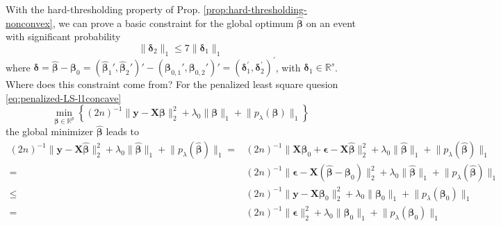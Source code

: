 \documentclass[twoside]{article}
\begin{document}
With the hard-thresholding property of Prop. \ref{prop:hard-thresholding-nonconvex}, we can prove a basic constraint for the global optimum $\hat{\boldsymbol{\beta}}$ on an event with significant probability \citep{fan2014asymptotic}
\begin{equation}\label{eq:basic_constrant}
    \lVert \boldsymbol{\delta}_2 \rVert _1 \leq 7 \lVert \boldsymbol{\delta}_1 \rVert _1
\end{equation}
where $\boldsymbol{\delta} = \hat{\boldsymbol{\beta}}-\boldsymbol{\beta}_0 = \left( \hat{\boldsymbol{\beta}}_1',\hat{\boldsymbol{\beta}}_2' \right)' - \left( {\boldsymbol{\beta}}_{0,1}',{\boldsymbol{\beta}}_{0,2}' \right)' = \left( \boldsymbol{\delta}^{\prime}_1,\boldsymbol{\delta}^{\prime}_2 \right)^{\prime}$, with $\boldsymbol{\delta}_1\in\mathbb{R}^s$. Where does this constraint come from? For the penalized least square quesion \ref{eq:penalized-LS-l1concave}
$$
\min_{\boldsymbol{\beta}\in\mathbb{R}^p}\left\{ (2n)^{-1}\lVert \mathbf{y}-\mathbf{X}\boldsymbol{\beta} \rVert ^2_2 + \lambda_0 \lVert \boldsymbol{\beta} \rVert _1 + \lVert p_{\lambda}(\boldsymbol{\beta}) \rVert _1  \right\}
$$
the global minimizer $\hat{\boldsymbol{\beta}}$ leads to 
\begin{align*}
    (2n)^{-1}\lVert \mathbf{y}-\mathbf{X}\hat{\boldsymbol{\beta}} \rVert ^2_2 + \lambda_0 \lVert \hat{\boldsymbol{\beta}} \rVert _1 + \lVert p_{\lambda}(\hat{\boldsymbol{\beta}}) \rVert _1 =& (2n)^{-1}\lVert \mathbf{X}\boldsymbol{\beta}_0+ \boldsymbol{\epsilon} -\mathbf{X}\hat{\boldsymbol{\beta}} \rVert ^2_2 + \lambda_0 \lVert \hat{\boldsymbol{\beta}} \rVert _1 + \lVert p_{\lambda}(\hat{\boldsymbol{\beta}}) \rVert _1 \\
    =& (2n)^{-1}\lVert \boldsymbol{\epsilon} -\mathbf{X}(\hat{\boldsymbol{\beta}}- \boldsymbol{\beta}_0) \rVert ^2_2 + \lambda_0 \lVert \hat{\boldsymbol{\beta}} \rVert _1 + \lVert p_{\lambda}(\hat{\boldsymbol{\beta}}) \rVert _1 \\
    \leq &  (2n)^{-1}\lVert \mathbf{y}-\mathbf{X}{\boldsymbol{\beta}_0} \rVert ^2_2 + \lambda_0 \lVert {\boldsymbol{\beta}_0} \rVert _1 + \lVert p_{\lambda}({\boldsymbol{\beta}_0}) \rVert _1\\
    =& (2n)^{-1}\lVert {\boldsymbol{\epsilon}} \rVert ^2_2 + \lambda_0 \lVert {\boldsymbol{\beta}_0} \rVert _1 + \lVert p_{\lambda}({\boldsymbol{\beta}_0}) \rVert _1
\end{align*}
\end{document}
